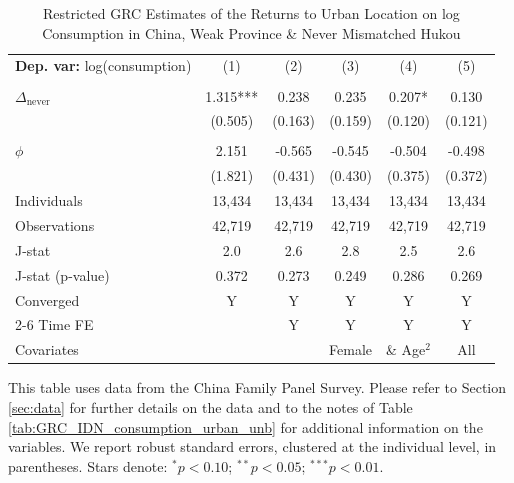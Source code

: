 \begin{table}[htbp] \centering \begin{threeparttable}
 \caption{Restricted GRC Estimates of the Returns to Urban Location on log Consumption in China, Weak Province & Never Mismatched Hukou} 
 \label{tab:GRC_CHN_w_nm_consumption_urban_unb} 
\begin{tabular}{l ccccc} \toprule  \textbf{Dep. var:}  log(consumption) 
                    &\multicolumn{1}{c}{(1)}   &\multicolumn{1}{c}{(2)}   &\multicolumn{1}{c}{(3)}   &\multicolumn{1}{c}{(4)}   &\multicolumn{1}{c}{(5)}   \\
                    &               &               &               &               &               \\
\addlinespace
$\Delta_{\text{never}}$&       1.315***&       0.238   &       0.235   &       0.207*  &       0.130   \\
                    &     (0.505)   &     (0.163)   &     (0.159)   &     (0.120)   &     (0.121)   \\
                    &               &               &               &               &               \\
\addlinespace
$\phi$              &       2.151   &      -0.565   &      -0.545   &      -0.504   &      -0.498   \\
                    &     (1.821)   &     (0.431)   &     (0.430)   &     (0.375)   &     (0.372)   \\
\addlinespace
Individuals         &      13,434   &      13,434   &      13,434   &      13,434   &      13,434   \\
Observations        &      42,719   &      42,719   &      42,719   &      42,719   &      42,719   \\
J-stat              &         2.0   &         2.6   &         2.8   &         2.5   &         2.6   \\
J-stat (p-value)    &       0.372   &       0.273   &       0.249   &       0.286   &       0.269   \\
Converged           &           Y   &           Y   &           Y   &           Y   &           Y   \\
\cmidrule{2-6} Time FE & & Y & Y & Y & Y \\ Covariates & & & Female & \& Age$^2$ & All \\ \bottomrule \end{tabular} \begin{tablenotes}[flushleft] \footnotesize \item{This table uses data from the China Family Panel Survey. Please refer to Section \ref{sec:data} for further details on the data and to the notes of Table \ref{tab:GRC_IDN_consumption_urban_unb} for additional information on the variables. We report robust standard errors, clustered at the individual level, in parentheses. Stars denote: $^{*} p<0.10$; $^{**} p<0.05$; $^{***} p<0.01$.} \end{tablenotes} \end{threeparttable} \end{table}
